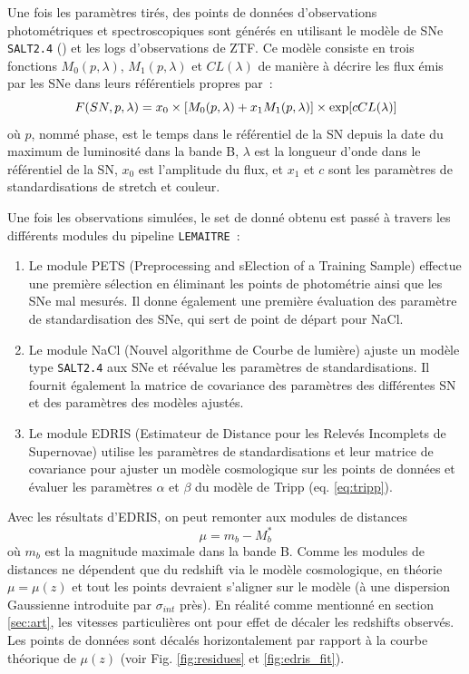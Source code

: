 \documentclass{book}
\begin{document}
Une fois les paramètres tirés, des points de données d'observations photométriques et spectroscopiques sont générés en utilisant le modèle de SNe \verb|SALT2.4| (\cite{guy_salt2_2007, rigault_ztf_2024}) et les logs d'observations de ZTF. Ce modèle consiste en trois fonctions $M_0(p, \lambda)$, $M_1(p, \lambda)$ et $CL(\lambda)$ de manière à décrire les flux émis par les SNe dans leurs référentiels propres par~:
\begin{equation}
    F(SN, p, \lambda) = x_0 \times \qty[M_0(p, \lambda) + x_1 M_1(p, \lambda)] \times \exp[c CL(\lambda)]
\end{equation}
où $p$, nommé phase, est le temps dans le référentiel de la SN depuis la date du maximum de luminosité dans la bande B, $\lambda$ est la longueur d'onde dans le référentiel de la SN, $x_0$ est l'amplitude du flux, et $x_1$ et $c$ sont les paramètres de standardisations de stretch et couleur.

Une fois les observations simulées, le set de donné obtenu est passé à travers les différents modules du pipeline \verb|LEMAITRE|~:
\begin{enumerate}
    \item Le module PETS (Preprocessing and sElection of a Training Sample) effectue une première sélection en éliminant les points de photométrie ainsi que les SNe mal mesurés. Il donne également une première évaluation des paramètre de standardisation des SNe, qui sert de point de départ pour NaCl.
    \item Le module NaCl (Nouvel algorithme de Courbe de lumière) ajuste un modèle type \verb|SALT2.4| aux SNe et réévalue les paramètres de standardisations. Il fournit également la matrice de covariance des paramètres des différentes SN et des paramètres des modèles ajustés.
    \item Le module EDRIS (Estimateur de Distance pour les Relevés Incomplets de Supernovae) utilise les paramètres de standardisations et leur matrice de covariance pour ajuster un modèle cosmologique sur les points de données et évaluer les paramètres $\alpha$ et $\beta$ du modèle de Tripp (eq. \ref{eq:tripp}).
\end{enumerate}

Avec les résultats d'EDRIS, on peut remonter aux modules de distances
\begin{equation}
    \mu = m_b - M_b^*
\end{equation}
où $m_b$ est la magnitude maximale dans la bande B.
Comme les modules de distances ne dépendent que du redshift via le modèle cosmologique, en théorie $\mu = \mu(z)$ et tout les points devraient s'aligner sur le modèle (à une dispersion Gaussienne introduite par $\sigma_{int}$ près). En réalité comme mentionné en section \ref{sec:art}, les vitesses particulières ont pour effet de décaler les redshifts observés. Les points de données sont décalés horizontalement par rapport à la courbe théorique de $\mu(z)$ (voir Fig. \ref{fig:residues} et \ref{fig:edris_fit}).
\end{document}
